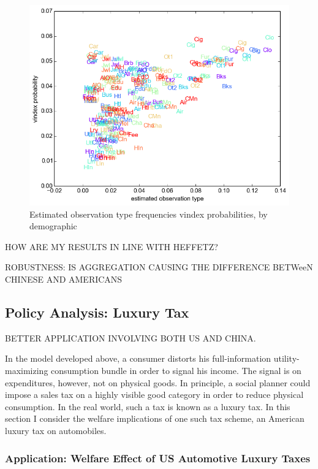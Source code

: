 \documentclass[12pt]{article}
\begin{document}
\begin{figure}
    \centering
	\includegraphics[scale=.8]{pics/obs_vin_scat.png}
    \caption{Estimated observation type frequencies vindex probabilities, by demographic}
    \label{fig:vinmatch}
\end{figure}

HOW ARE MY RESULTS IN LINE WITH HEFFETZ?

ROBUSTNESS: IS AGGREGATION CAUSING THE DIFFERENCE BETWeeN CHINESE AND AMERICANS

\subsection{Policy Analysis: Luxury Tax}

BETTER APPLICATION INVOLVING BOTH US AND CHINA.

In the model developed above, a consumer distorts his full-information utility-maximizing consumption bundle in order to signal his income.  The signal is on expenditures, however, not on physical goods.  In principle, a social planner could impose a sales tax on a highly visible good category in order to reduce physical consumption.  In the real world, such a tax is known as a luxury tax.  In this section I consider the welfare implications of one such tax scheme, an American luxury tax on automobiles.

\subsubsection{Application: Welfare Effect of US Automotive Luxury Taxes}
\end{document}
